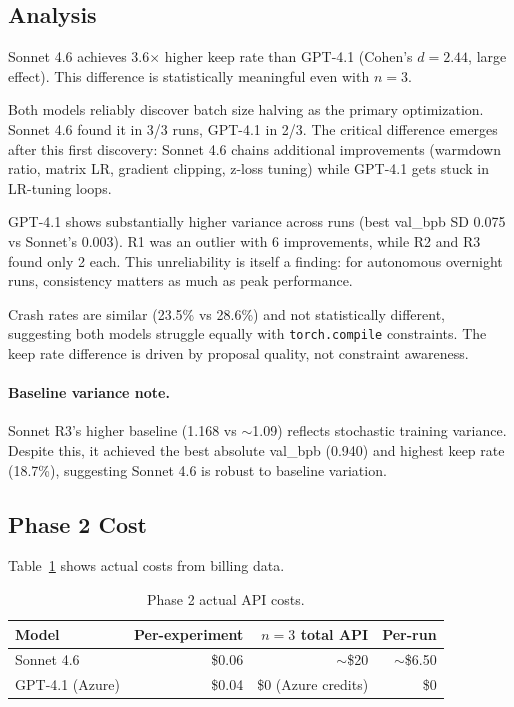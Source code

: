 \documentclass[11pt]{article}
\begin{document}
\subsection{Analysis}
\label{sec:phase2_analysis}

Sonnet 4.6 achieves 3.6$\times$ higher keep rate than GPT-4.1 (Cohen's $d = 2.44$, large effect). This difference is statistically meaningful even with $n=3$.

Both models reliably discover batch size halving as the primary optimization. Sonnet 4.6 found it in 3/3 runs, GPT-4.1 in 2/3. The critical difference emerges after this first discovery: Sonnet 4.6 chains additional improvements (warmdown ratio, matrix LR, gradient clipping, z-loss tuning) while GPT-4.1 gets stuck in LR-tuning loops.

GPT-4.1 shows substantially higher variance across runs (best val\_bpb SD 0.075 vs Sonnet's 0.003). R1 was an outlier with 6 improvements, while R2 and R3 found only 2 each. This unreliability is itself a finding: for autonomous overnight runs, consistency matters as much as peak performance.

Crash rates are similar (23.5\% vs 28.6\%) and not statistically different, suggesting both models struggle equally with \texttt{torch.compile} constraints. The keep rate difference is driven by proposal quality, not constraint awareness.

\paragraph{Baseline variance note.} Sonnet R3's higher baseline (1.168 vs $\sim$1.09) reflects stochastic training variance. Despite this, it achieved the best absolute val\_bpb (0.940) and highest keep rate (18.7\%), suggesting Sonnet 4.6 is robust to baseline variation.

\subsection{Phase 2 Cost}
\label{sec:phase2_cost}

Table~\ref{tab:phase2_cost} shows actual costs from billing data.

\begin{table}[H]
\centering
\caption{Phase 2 actual API costs.}
\label{tab:phase2_cost}
\begin{tabular}{lrrr}
\toprule
\textbf{Model} & \textbf{Per-experiment} & \textbf{$n=3$ total API} & \textbf{Per-run} \\
\midrule
Sonnet 4.6            & \$0.06 & $\sim$\$20 & $\sim$\$6.50 \\
GPT-4.1 (Azure)       & \$0.04 & \$0 (Azure credits) & \$0 \\
\bottomrule
\end{tabular}
\end{table}
\end{document}
